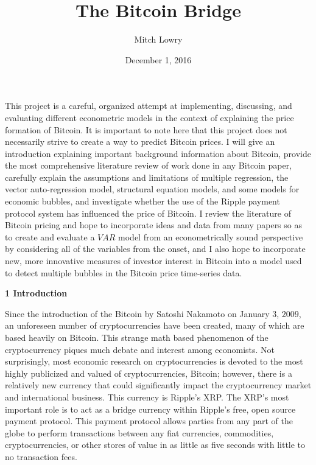 \documentclass{article}[10 pt]
\title{The Bitcoin Bridge}
\date{December 1, 2016}
\author{Mitch Lowry}
\newcommand{\vs}{\vspace{0.1in}}
\begin{document}
\maketitle

This project is a careful, organized attempt at implementing, discussing,
and evaluating different econometric models in the context of explaining the
price formation of Bitcoin. It is important to note here that this project
does not necessarily strive to create a way to predict Bitcoin prices. I
will give an introduction explaining important background information about
Bitcoin, provide the most comprehensive literature review of work done in
any Bitcoin paper, carefully explain the assumptions and limitations of multiple 
regression, the vector auto-regression model, structural equation models, 
and some models for economic bubbles, and investigate whether the use of the 
Ripple payment protocol system has influenced the price of Bitcoin. I review
the literature of Bitcoin pricing and hope to incorporate ideas and data from many
papers so as to create and evaluate a $VAR$ model from an econometrically
sound perspective by considering all of the variables from the onset, and I
also hope to incorporate new, more innovative measures of investor interest
in Bitcoin into a model used to detect multiple bubbles in the Bitcoin price time-series data.

\vs

\textbf{1 Introduction}

\vs

Since the introduction of the Bitcoin by Satoshi Nakamoto on January $3$,
$2009$, an unforeseen number of cryptocurrencies have been created, many of
which are based heavily on Bitcoin. This strange math based phenomenon of
the cryptocurrency piques much debate and interest among economists. Not
surprisingly, most economic research on cryptocurrencies is devoted to the
most highly publicized and valued of cryptocurrencies, Bitcoin; however,
there is a relatively new currency that could significantly impact the
cryptocurrency market and international business. This currency is Ripple’s
XRP. The XRP’s most important role is to act as a bridge currency within
Ripple’s free, open source payment protocol. This payment protocol allows
parties from any part of the globe to perform transactions between any fiat
currencies, commodities, cryptocurrencies, or other stores of value in as
little as five seconds with little to no transaction fees.

\vs
\end{document}
